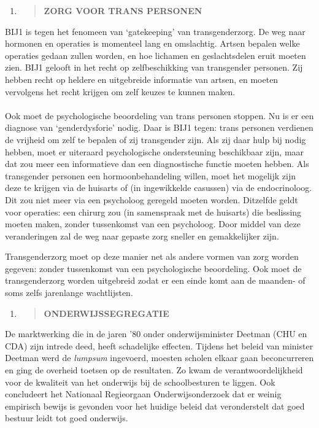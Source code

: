 \begin{enumerate}
\def\labelenumi{\arabic{enumi}.}
\setcounter{enumi}{4}
\item
  \begin{quote}
  \textbf{ZORG VOOR TRANS PERSONEN}
  \end{quote}
\end{enumerate}

BIJ1 is tegen het fenomeen van `gatekeeping' van transgenderzorg. De weg
naar hormonen en operaties is momenteel lang en omslachtig. Artsen
bepalen welke operaties gedaan zullen worden, en hoe lichamen en
geslachtsdelen eruit moeten zien. BIJ1 gelooft in het recht op
zelfbeschikking van transgender personen. Zij hebben recht op heldere en
uitgebreide informatie van artsen, en moeten vervolgens het recht
krijgen om zelf keuzes te kunnen maken.\\
~\\
Ook moet de psychologische beoordeling van trans personen stoppen. Nu is
er een diagnose van `genderdysforie' nodig. Daar is BIJ1 tegen: trans
personen verdienen de vrijheid om zelf te bepalen of zij transgender
zijn. Als zij daar hulp bij nodig hebben, moet er uiteraard
psychologische ondersteuning beschikbaar zijn, maar dat zou meer een
informatieve dan een diagnostische functie moeten hebben. Als
transgender personen een hormoonbehandeling willen, moet het mogelijk
zijn deze te krijgen via de huisarts of (in ingewikkelde casussen) via
de endocrinoloog. Dit zou niet meer via een psycholoog geregeld moeten
worden. Ditzelfde geldt voor operaties: een chirurg zou (in samenspraak
met de huisarts) die beslissing moeten maken, zonder tussenkomst van een
psycholoog. Door middel van deze veranderingen zal de weg naar gepaste
zorg sneller en gemakkelijker zijn.

Transgenderzorg moet op deze manier net als andere vormen van zorg
worden gegeven: zonder tussenkomst van een psychologische beoordeling.
Ook moet de transgenderzorg worden uitgebreid zodat er een einde komt
aan de maanden- of soms zelfs jarenlange wachtlijsten.

\begin{enumerate}
\def\labelenumi{\arabic{enumi}.}
\setcounter{enumi}{5}
\item
  \begin{quote}
  \textbf{ONDERWIJSSEGREGATIE}
  \end{quote}
\end{enumerate}

De marktwerking die in de jaren '80 onder onderwijsminister Deetman (CHU
en CDA) zijn intrede deed, heeft schadelijke effecten. Tijdens het
beleid van minister Deetman werd de \emph{lumpsum} ingevoerd, moesten
scholen elkaar gaan beconcurreren en ging de overheid toetsen op de
resultaten. Zo kwam de verantwoordelijkheid voor de kwaliteit van het
onderwijs bij de schoolbesturen te liggen. Ook concludeert het Nationaal
Regieorgaan Onderwijsonderzoek dat er weinig empirisch bewijs is
gevonden voor het huidige beleid dat veronderstelt dat goed bestuur
leidt tot goed onderwijs.


